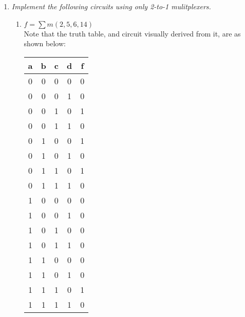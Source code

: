 \documentclass[12pt]{article}
\begin{document}
\begin{enumerate}
\newpage
\item \textit{Implement the following circuits using only 2-to-1 mulitplexers.}
  \begin{enumerate}
	   \item $f = \sum m(2,5,6,14)$ \\
	       Note that the truth table, and circuit visually derived from it, are as shown below:
         \begin{center}
	      	  \begin{minipage}{0.2\textwidth}
              \begin{center}
                \begin{tabular}{cccc|c}
                  a & b & c & d & f \\
                  \hline
                  0 & 0 & 0 & 0 & 0 \\
                  0 & 0 & 0 & 1 & 0 \\
                  0 & 0 & 1 & 0 & 1 \\
                  0 & 0 & 1 & 1 & 0 \\
                  0 & 1 & 0 & 0 & 1 \\
                  0 & 1 & 0 & 1 & 0 \\
                  0 & 1 & 1 & 0 & 1 \\
                  0 & 1 & 1 & 1 & 0 \\
                  1 & 0 & 0 & 0 & 0 \\
                  1 & 0 & 0 & 1 & 0 \\
                  1 & 0 & 1 & 0 & 0 \\
                  1 & 0 & 1 & 1 & 0 \\
                  1 & 1 & 0 & 0 & 0 \\
                  1 & 1 & 0 & 1 & 0 \\
                  1 & 1 & 1 & 0 & 1 \\
                  1 & 1 & 1 & 1 & 0
                \end{tabular}
              \end{center}
            \end{minipage}
            \hfill
            \begin{minipage}{0.6\textwidth}
              \begin{center}
\end{center}
\end{minipage}
\end{center}
\end{enumerate}
\end{enumerate}
\end{document}
